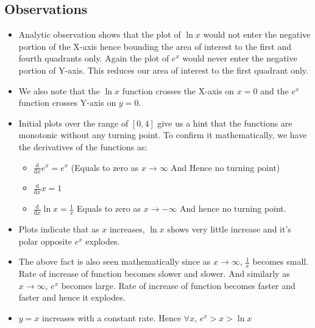 \documentclass{article}
\begin{document}
\subsection{Observations}
\begin{itemize}
    \item Analytic observation shows that the plot of $\ln{x}$ would not enter the negative portion of the X-axis hence bounding the area of interest to the first and fourth quadrants only. Again the plot of $e^x$ would never enter the negative portion of Y-axis. This reduces our area of interest to the first quadrant only.
    \item We also note that the $\ln{x}$ function crosses the X-axis on $x = 0$ and the $e^{x}$ function crosses Y-axis on $y = 0$.
    \item Initial plots over the range of $[0, 4]$ give us a hint that the functions are monotonic without any turning point. To confirm it mathematically, we have the derivatives of the functions as:
    \begin{itemize}
        \item $\frac{\mathrm{d}}{\mathrm{d}x} e^x = e^x$ (Equals to zero as $x \to \infty$ And Hence no turning point)
        \item $\frac{\mathrm{d}}{\mathrm{d}x} x = 1$
        \item $\frac{\mathrm{d}}{\mathrm{d}x} \ln{x} = \frac{1}{x}$ {Equals to zero as $x \to -\infty$ And hence no turning point.}
    \end{itemize}
    \item Plots indicate that as $x$ increases, $\ln{x}$ shows very little increase and it's polar opposite $e^x$ explodes.
    \item The above fact is also seen mathematically since as $x \to \infty$, $\frac{1}{x}$ becomes small. Rate of increase of function becomes slower and slower. And similarly as $x \to \infty$, $e^x$ becomes large. Rate of increase of function becomes faster and faster and hence it explodes.
    \item $y = x$ increases with a constant rate. Hence $\forall x$,  $e^x > x > \ln{x}$
\end{itemize}
\newpage
\end{document}
